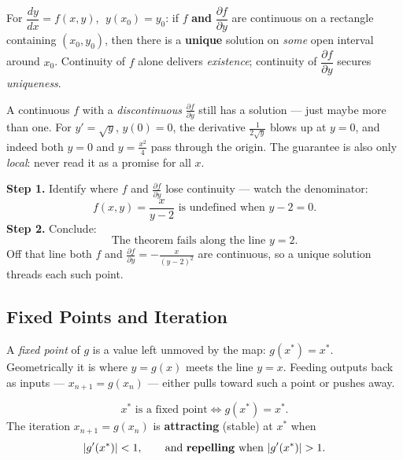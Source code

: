 \begin{formulabox}
For $\dfrac{dy}{dx} = f(x,y)$, $\;y(x_0)=y_0$: if $f$ \textbf{and}
$\dfrac{\partial f}{\partial y}$ are continuous on a rectangle containing
$(x_0,y_0)$, then there is a \textbf{unique} solution on \emph{some} open
interval around $x_0$. Continuity of $f$ alone delivers \emph{existence};
continuity of $\dfrac{\partial f}{\partial y}$ secures \emph{uniqueness}.
\end{formulabox}

\begin{warningbox}
A continuous $f$ with a \emph{discontinuous} $\frac{\partial f}{\partial y}$
still has a solution --- just maybe more than one. For $y' = \sqrt{y}$,
$y(0)=0$, the derivative $\frac{1}{2\sqrt{y}}$ blows up at $y=0$, and indeed
both $y=0$ and $y=\frac{x^2}{4}$ pass through the origin. The guarantee is also
only \emph{local}: never read it as a promise for all $x$.
\end{warningbox}

\begin{examplebox}[Worked Example 3.3: Where uniqueness fails for $\frac{dy}{dx}=\frac{x}{y-2}$]
\textbf{Step 1.} Identify where $f$ and $\frac{\partial f}{\partial y}$ lose
continuity --- watch the denominator:
\[ f(x,y) = \frac{x}{y-2} \text{ is undefined when } y - 2 = 0. \]
\textbf{Step 2.} Conclude:
\[ \text{The theorem fails along the line } y = 2. \]
Off that line both $f$ and $\frac{\partial f}{\partial y} = -\frac{x}{(y-2)^2}$
are continuous, so a unique solution threads each such point.
\end{examplebox}

\subsection{Fixed Points and Iteration}

A \emph{fixed point} of $g$ is a value left unmoved by the map: $g(x^*)=x^*$.
Geometrically it is where $y=g(x)$ meets the line $y=x$. Feeding outputs back as
inputs --- $x_{n+1}=g(x_n)$ --- either pulls toward such a point or pushes away.

\begin{formulabox}
\[ x^* \text{ is a fixed point} \iff g(x^*) = x^*. \]
The iteration $x_{n+1} = g(x_n)$ is \textbf{attracting} (stable) at $x^*$ when
\[ |g'(x^*)| < 1, \qquad \text{and \textbf{repelling} when } |g'(x^*)| > 1. \]
\end{formulabox}

